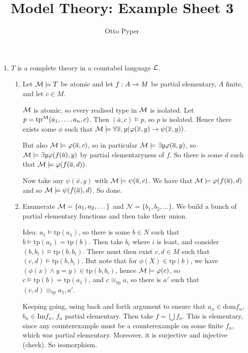 \documentclass[10pt]{article}
\title{Model Theory: Example Sheet 3}
\author{Otto Pyper}
\date{}
\renewcommand{\N}{\mathcal{N}}
\newcommand{\tp}{\textrm{tp}}
\begin{document}
\maketitle


\begin{enumerate}
    \item $T$ is a complete theory in a countabel language $\mathcal{L}$.
    \begin{enumerate}[label = (\alph*)]
        \item Let $\mathcal{M}\models T$ be atomic and let $f : A \rightarrow M$ be partial elementary, $A$ finite, and let $c \in M$.
        
        $\mathcal{M}$ is atomic, so every realised type in $\mathcal{M}$ is isolated. Let $p = \tp^\M(a_1,\dots,a_n,c)$. Then $(\bar{a},c)\models p$, so $p$ is isolated. Hence there exists some $\phi$ such that $\mathcal{M}\models \forall \overline{x},y (\varphi(\overline{x},y)\rightarrow \psi(\overline{x},y))$.

        But also $\mathcal{M}\models \varphi(\overline{a},c)$, so in particular $\mathcal{M}\models \exists y\varphi(\overline{a},y)$, so $\mathcal{M}\models \exists y\varphi(f(\overline{a}),y)$ by partial elementaryness of $f$. So there is some $d$ such that $\mathcal{M} \models \varphi(f(\overline{a},d))$.

        Now take any $\psi(\bar{x},y)$ with $\mathcal{M}\models \psi(\overline{a},c)$. We have that $\mathcal{M}\models \varphi(f(\overline{a}),d)$ and so $\mathcal{M}\models \psi(f(\overline{a}),d)$. So done.

        \item Enumerate $\mathcal{M} = \{a_1,a_2,\dots\}$ and $\N = \{b_1,b_2,\dots\}$. We build a bunch of partial elementary functions and then take their union.
        
        Idea: $a_1\models \tp(a_1)$, so there is some $b \in N$ such that $b\models \tp(a_1) = \tp(b)$. Then take $b_i$ where $i$ is least, and consider $(b,b_i)\models \tp(b,b_i)$. There must then exist $c,d \in M$ such that $(c,d)\models \tp(b,b_i)$. But note that for $\phi(X) \in \tp(b)$, we have $(\phi(x) \land y = y) \in \tp(b,b_i)$, hence $\mathcal{M}\models \varphi(c)$, so $c\models \tp(b) = \tp(a_1)$, and $c\equiv_{\tp}a$, so there is $a'$ such that $(c,d)\equiv_\tp a_1,a'$.

        Keeping going, using back and forth argument to ensure that $a_n \in \textrm{dom} f_n$, $b_n \in \textrm{Im}f_n$, $f_n$ partial elementary. Then take $f = \bigcup f_n$. This is elementary, since any counterexample must be a counterexample on some finite $f_n$, which was partial elementary. Moreover, it is surjective and injective (check). So isomorphism.


\end{enumerate}
\end{enumerate}
\end{document}
